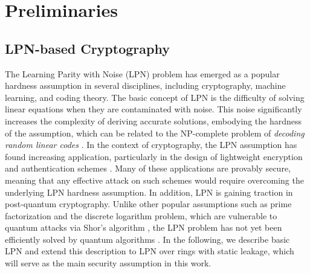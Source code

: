 \chapter{Preliminaries}
\section{LPN-based Cryptography}
The Learning Parity with Noise (LPN) problem has emerged as a popular hardness assumption in several disciplines, including cryptography, machine learning, and coding theory. The basic concept of LPN is the difficulty of solving linear equations when they are contaminated with noise. This noise significantly increases the complexity of deriving accurate solutions, embodying the hardness of the assumption, which can be related to the NP-complete problem of \textit{decoding random linear codes} \cite{yu2016pseudorandom}. In the context of cryptography, the LPN assumption has found increasing application, particularly in the design of lightweight encryption and authentication schemes \cite{pietrzak2012cryptography}. Many of these applications are provably secure, meaning that any effective attack on such schemes would require overcoming the underlying LPN hardness assumption. In addition, LPN is gaining traction in post-quantum cryptography. Unlike other popular assumptions such as prime factorization and the discrete logarithm problem, which are vulnerable to quantum attacks via Shor's algorithm \cite{shor1999polynomial}, the LPN problem has not yet been efficiently solved by quantum algorithms \cite{zhao2018hardness}. 
In the following, we describe basic LPN and extend this description to LPN over rings with static leakage, which will serve as the main security assumption in this work.

